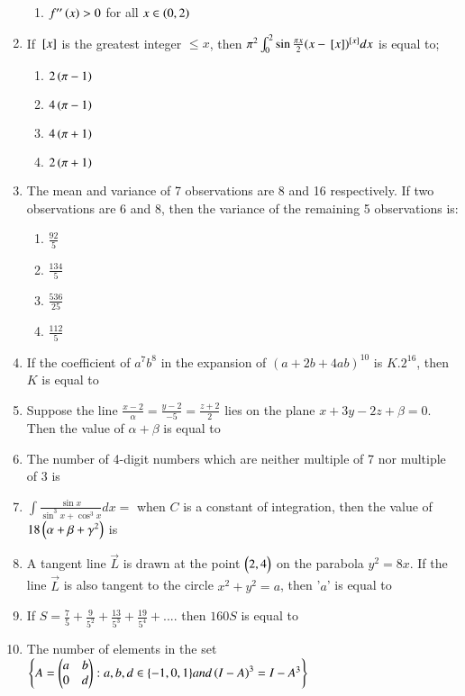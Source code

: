 \documentclass[journal]{IEEEtran}
\begin{document}
\begin{enumerate}
\begin{enumerate}
			\item  $f^{\prime\prime}\left(x\right) > 0$ for all $x \in \left(0, 2\right)$
		\end{enumerate}
	\item 
	If ${}\left[x\right]$ is the greatest integer $\leq x$, then $\pi^{2}\int_{0}^{2} \sin{\frac{\pi x}{2}}(x-{}\left[x\right])^{{}\left[x\right]} dx$ is equal to;
		\begin{enumerate}
			\item $2\left(\pi-1\right)$
			\item $4\left(\pi-1\right)$
			\item $4\left(\pi+1\right)$
			\item $2\left(\pi+1\right)$
		\end{enumerate}
	\item 
	The mean and variance of 7 observations are 8 and 16 respectively. If two observations are 6 and 8, then the variance of the remaining 5 observations is:
		\begin{enumerate}
			\item $\frac{92}{5}$
			\item $\frac{134}{5}$
			\item $\frac{536}{25}$
			\item $\frac{112}{5}$
		\end{enumerate}
    \item 
    If the coefficient of $a^{7}b^{8}$ in the expansion of $(a + 2b + 4ab)^{10}$ is $K.2^{16}$, then $K$ is equal to
    \item
	Suppose the line $\frac{x-2}{\alpha} = \frac{y-2}{-5} = \frac{z+2}{2}$ lies on the plane  $x + 3y - 2z + \beta = 0$. Then the value of $\alpha + \beta$ is equal to 
	\item 
	The number of 4-digit numbers which are neither multiple of 7 nor multiple of 3 is 
	\item 
	$\int \frac{\sin{x}}{\sin^3{x} + \cos^3{x}} dx =$ when $C$ is a constant of integration, then the value of $18\left(\alpha+\beta+\gamma^{2}\right)$ is
	\item
	A tangent line $\vec{L}$ is drawn at the point $\begin{pmatrix}2 , 4\end{pmatrix}$ on the parabola $y^{2}= 8x$. If the line $\vec{L}$ is also tangent to the circle $x^2 + y^2 = a$, then '$a$' is equal to
	\item 
	If $S=\frac{7}{5} + \frac{9}{5^{2}} + \frac{13}{5^{3}} + \frac{19}{5^{4}} + ....$ then $160S$ is equal to 
	\item 
	The number of elements in the set  \\
	
	$\left\{A = \begin{pmatrix}a & b \\ 0 & d\end{pmatrix}: a,b,d \in \{-1,0,1\} and \left(I-A\right)^{3} = I - A^{3}\right\}$
	

\end{enumerate}
\end{document}
